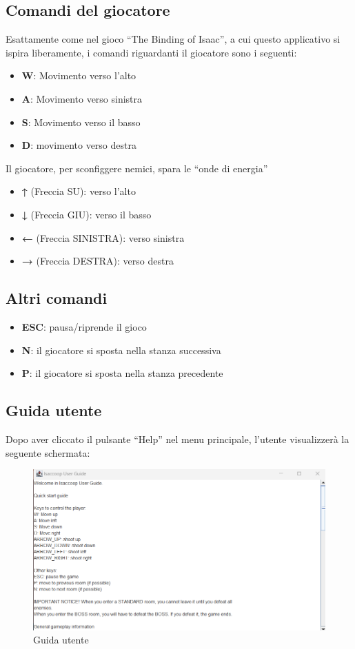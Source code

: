 \documentclass[a4paper,12pt]{report}
\begin{document}
\subsection*{Comandi del giocatore}
Esattamente come nel gioco ``The Binding of Isaac'', a cui questo applicativo si ispira liberamente, i comandi riguardanti il giocatore sono i seguenti:
\begin{itemize}
    \item \textbf{W}: Movimento verso l'alto
    \item \textbf{A}: Movimento verso sinistra
    \item \textbf{S}: Movimento verso il basso
    \item \textbf{D}: movimento verso destra
\end{itemize}
Il giocatore, per sconfiggere nemici, spara le ``onde di energia''
\begin{itemize}
    \item \textbf{↑} (Freccia SU): verso l'alto
    \item \textbf{↓} (Freccia GIU): verso il basso
    \item \textbf{←} (Freccia SINISTRA): verso sinistra
    \item \textbf{→} (Freccia DESTRA): verso destra
\end{itemize}

\subsection*{Altri comandi}
\begin{itemize}
    \item \textbf{ESC}: pausa/riprende il gioco
    \item \textbf{N}: il giocatore si sposta nella stanza successiva
    \item \textbf{P}: il giocatore si sposta nella stanza precedente
\end{itemize}


\subsection*{Guida utente}
Dopo aver cliccato il pulsante ``Help'' nel menu principale, l'utente visualizzerà la seguente schermata:
\begin{figure}[H]
\centering{}
\includegraphics[width=\textwidth]{img/help.png}
\caption{Guida utente}
\label{img/help}
\end{figure}
\end{document}
